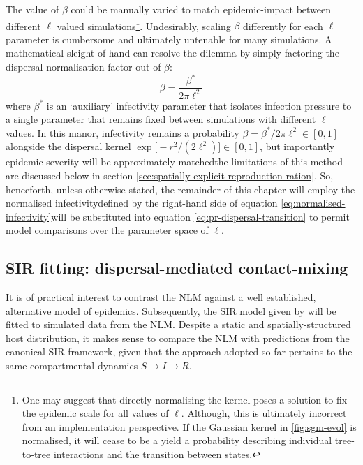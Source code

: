  The value of $\beta$ could be manually varied to match epidemic-impact between different $\ell$ valued simulations\footnote{One may suggest that directly normalising the kernel poses a solution to fix the epidemic scale for all values of $\ell$.
Although, this is ultimately incorrect from an implementation perspective. 
If the Gaussian kernel in \ref{fig:sgm-evol} is normalised, it will cease to be a yield a probability describing individual tree-to-tree interactions and the transition between states.}.
Undesirably, scaling $\beta$ differently for each $\ell$ parameter is cumbersome and ultimately untenable for many simulations.
A mathematical sleight-of-hand can resolve the dilemma by simply factoring the dispersal normalisation factor out of $\beta$:
\begin{equation}
    \beta = \frac{\beta^*}{2\pi\ell^2}
    \label{eq:normalised-infectivity}
\end{equation}
where $\beta^*$ is an `auxiliary' infectivity parameter that isolates infection pressure to a single parameter that remains fixed between simulations with different $\ell$ values.
In this manor, infectivity remains a probability $\beta=\beta^*/2\pi\ell^2 \in [0, 1]$ alongside the dispersal kernel $\exp\big[-r^2/(2\ell^2)\big] \in [0, 1]$, but importantly epidemic severity will be approximately matched\textemdash the limitations of this method are discussed below in section \ref{sec:spatially-explicit-reproduction-ration}.
So, henceforth, unless otherwise stated, the remainder of this chapter will employ the normalised infectivity\textemdash defined by the right-hand side of equation \ref{eq:normalised-infectivity}\textemdash will be substituted into equation \ref{eq:pr-dispersal-transition} to permit model comparisons over the parameter space of $\ell$.

\newpage

\subsection{SIR fitting: dispersal-mediated contact-mixing}

It is of practical interest to contrast the NLM against a well established, alternative model of epidemics.
Subsequently, the SIR model given by \cite{kermack-model} will be fitted to simulated data from the NLM.
Despite a static and spatially-structured host distribution, it makes sense to compare the NLM with predictions from the canonical SIR framework, given that the approach adopted so far pertains to the same compartmental dynamics $S \rightarrow I \rightarrow R$.

